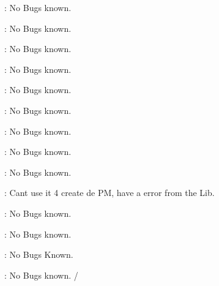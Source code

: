 \begin{DoxyRefList}
\item[Member \mbox{\hyperlink{class_c_camera_ad2024c2971fc624c0737b8b463359e3d}{C\+Camera::set\+Front}} (vec3 in\+At, vec3 in\+Pos)]\label{bug__bug000018}%
%
\+: No Bugs known.  
\item[Member \mbox{\hyperlink{class_c_camera_aeb6aa226e2b0dae3c3a1a3aad15b5ada}{C\+Camera::set\+Heigth}} (float in\+Heigth)]\label{bug__bug000023}%
%
\+: No Bugs known.  
\item[Member \mbox{\hyperlink{class_c_camera_a229525e8bcec72b395a2ed7482b47760}{C\+Camera::set\+L\+At}} (vec3 in\+L\+At)]\label{bug__bug000016}%
%
\+: No Bugs known.  
\item[Member \mbox{\hyperlink{class_c_camera_a60fdfe13aaeba5ef6e33816b097b56a5}{C\+Camera::set\+Near}} (float in\+Near)]\label{bug__bug000024}%
%
\+: No Bugs known.  
\item[Member \mbox{\hyperlink{class_c_camera_a70749a70a3deeb9a97a3cb3cc988fc93}{C\+Camera::set\+Pos}} (vec3 in\+Pos)]\label{bug__bug000015}%
%
\+: No Bugs known.  
\item[Member \mbox{\hyperlink{class_c_camera_a1e61050a7f41add2c779f9a94a0ffbc9}{C\+Camera::set\+Right}} (vec3 in\+Up, vec3 in\+Front)]\label{bug__bug000019}%
%
\+: No Bugs known.  
\item[Member \mbox{\hyperlink{class_c_camera_a31ad51b1d978c2ce1c50bb6461591d94}{C\+Camera::set\+Up}} (vec3 in\+Up)]\label{bug__bug000017}%
%
\+: No Bugs known.  
\item[Member \mbox{\hyperlink{class_c_camera_ace785e56ad70d300007d6ed5dd8a303d}{C\+Camera::set\+Up}} (vec3 in\+Front, vec3 in\+Right)]\label{bug__bug000020}%
%
\+: No Bugs known.  
\item[Member \mbox{\hyperlink{class_c_camera_ae5f40518857c4e6d536f88ee865698fb}{C\+Camera::set\+Width}} (float in\+Width)]\label{bug__bug000022}%
%
\+: No Bugs known.  
\item[Member \mbox{\hyperlink{class_c_camera_ad2c6556a2b8b97838323038b2661fa47}{C\+Camera::update\+PM}} ()]\label{bug__bug000040}%
%
\+: Can\textquotesingle{}t use it 4 create de PM, have a error from the Lib.  
\item[Member \mbox{\hyperlink{class_c_camera_a98f61aca7cce671a201e841073815571}{C\+Camera::update\+VM}} ()]\label{bug__bug000036}%
%
\+: No Bugs known.  
\item[Member \mbox{\hyperlink{class_c_camera_a0123231b9f52caebf8cc7e95baa1403e}{C\+Camera::$\sim$\+C\+Camera}} ()]\label{bug__bug000013}%
%
\+: No Bugs known.  
\item[Class \mbox{\hyperlink{class_c_camera_f_p}{C\+Camera\+FP}} ]\label{bug__bug000049}%
%
\+: No Bugs Known.  
\item[File \mbox{\hyperlink{_c_camera_f_p_8h}{C\+Camera\+FP.h}} ]\label{bug__bug000047}%
%
\+: No Bugs known. /


\end{DoxyRefList}
